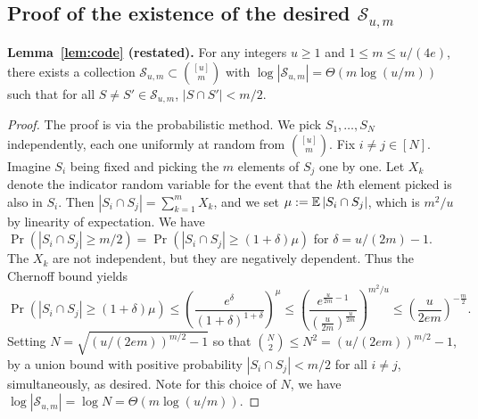 \subsection{Proof of the existence of the desired $\mathcal S_{u,m}$}\label{sec:code}
\noindent \textbf{Lemma~\ref{lem:code} (restated).}
For any integers $u\ge 1$ and $1\le m\le u/(4e)$, there exists a collection $\mathcal S_{u,m} \subset \binom{[u]}m$ with $\log |\mathcal{S}_{u,m}| = \Theta(m\log(u/m))$ such that for all $S\neq S'\in \mathcal S_{u,m}$, $|S\cap S'| < m/2$.
\begin{proof}
The proof is via the probabilistic method. We pick $S_1,\ldots,S_N$ independently, each one uniformly at random from $\binom{[u]}m$. Fix $i\neq j\in[N]$. Imagine $S_i$ being fixed and picking the $m$ elements of $S_j$ one by one. Let $X_k$ denote the indicator random variable for the event that the $k$th element picked is also in $S_i$. Then $|S_i\cap S_j| = \sum_{k=1}^m X_k$, and we set $\mu:= \operatorname*{\mathbb{E}} |S_i\cap S_j|$, which is $m^2/u$ by linearity of expectation. We have $\Pr(|S_i \cap S_j| \ge m/2) = \Pr(|S_i\cap S_j| \ge (1+\delta)\mu)$ for $\delta = u/(2m) - 1$. The $X_k$ are not independent, but they are negatively dependent. Thus the Chernoff bound yields
$$
\Pr(|S_i\cap S_j| \ge (1+\delta)\mu) \le \left(\frac{e^{\delta}}{(1+\delta)^{1+\delta}}\right)^\mu \le \left(\frac{e^{\frac u{2m} - 1}}{(\frac u{2m})^{\frac u{2m}}}\right)^{m^2/u} \le \left(\frac u{2em}\right)^{-\frac m2} .
$$
Setting $N = \sqrt{(u/(2em))^{m/2} - 1}$ so that ${N \choose 2}\leq N^2=(u/(2em))^{m/2} - 1$, by a union bound with positive probability $|S_i\cap S_j| < m/2$ for all $i\neq j$, simultaneously, as desired. Note for this choice of $N$, we have $\log|\mathcal S_{u,m}| = \log N = \Theta(m\log(u/m))$.
\end{proof}
